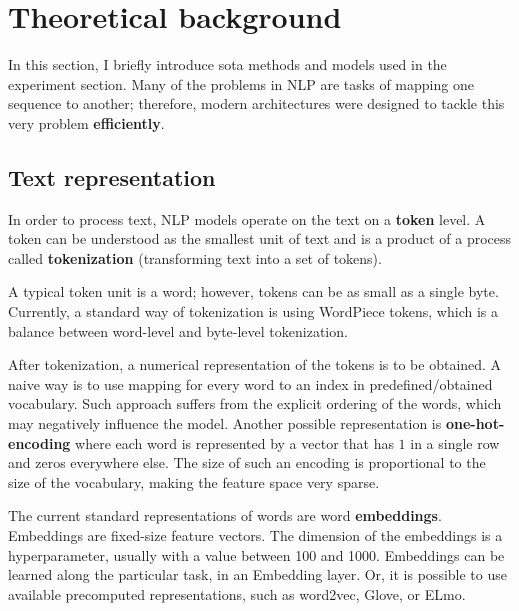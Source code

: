 \chapter{Theoretical background}\label{theory}
In this section, I briefly introduce \gls{sota} methods and models used in the experiment section. Many of the problems in NLP are tasks of mapping one sequence to another; therefore, modern architectures were designed to tackle this very problem \textbf{efficiently}.




\section{Text representation}
In order to process text, NLP models operate on the text on a \textbf{token} level. A token can be understood as the smallest unit of text and is a product of a process called \textbf{tokenization} (transforming text into a set of tokens).

A typical token unit is a word; however, tokens can be as small as a single byte. Currently, a standard way of tokenization is using WordPiece tokens, which is a balance between word-level and byte-level tokenization.

After tokenization, a numerical representation of the tokens is to be obtained. A naive way is to use mapping for every word to an index in predefined/obtained vocabulary. Such approach suffers from the explicit ordering of the words, which may negatively influence the model. Another possible representation is \textbf{one-hot-encoding} where each word is represented by a vector that has $1$ in a single row and zeros everywhere else. The size of such an encoding is proportional to the size of the vocabulary, making the feature space very sparse. 

The current standard representations of words are word \textbf{embeddings}. Embeddings are fixed-size feature vectors. The dimension of the embeddings is a hyperparameter, usually with a value between 100 and 1000. Embeddings can be learned along the particular task, in an Embedding layer. Or, it is possible to use available precomputed representations, such as word2vec, Glove, or ELmo.
\newpage





